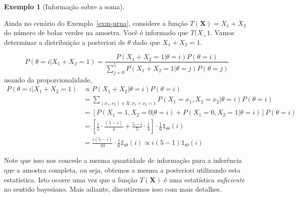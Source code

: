 \documentclass[
  portuguese,
  letterpaper,
  DIV=11,
  numbers=noendperiod]{scrreport}
\theoremstyle{definition}
\theoremstyle{definition}
\newtheorem{example}{Exemplo}[chapter]
\theoremstyle{plain}
\theoremstyle{remark}
\begin{document}
\begin{example}[Informação sobre a
soma]\protect\hypertarget{exm-infosomaurna}{}\label{exm-infosomaurna}

Ainda no cenário do Exemplo~\ref{exm-urna}, considere a função
\(T(\boldsymbol{X}) = X_1 +
X_2\) do número de bolas verdes na amostra. Você é informado que
\(T(X_ = 1\). Vamos determinar a distribuição a posteriori de \(\theta\)
dado que \(X_1 + X_2 = 1\).

\[
P(\theta = i \rvert X_1 + X_2 = 1) = \frac{P(X_1 + X_2 = 1 \rvert \theta =
i)P(\theta=i)}{\sum\limits^5_{j=0}P(X_1 + X_2 = 1 \rvert \theta = j)P(\theta=j)}
\] usando da proporcionalidade, \[
\begin{aligned}
P(\theta = i \rvert X_1 + X_2 = 1) &\propto P(X_1 + X_2 \rvert \theta =
i)P(\theta = i)\\ 
&= \sum\limits_{(x_1,x_2) \in \mathfrak{X} : x_1 + x_2 = 1}
P(X_1 = x_1, X_2 = x_2 \rvert \theta = i)P(\theta = i) \\
&= [P(X_1 = 1, X_2 = 0 \rvert \theta = i) + P(X_1 = 0, X_2 = 1 \rvert \theta = i)]P(\theta = i) \\
&= \left[\frac{i}{5} \cdot \frac{(5-i)}{4} + \frac{5-i}{5} \cdot \frac{i}{4}\right] \cdot \frac{1}{6} \mathbb{1}_\Theta(i) \\
&= \frac{i(5-i)}{10} \cdot \frac{1}{6} \mathbb{1}_\Theta(i) \propto i(5-1)
\mathbb{1}_\Theta(i)
\end{aligned}
\]

Note que isso nos concede a mesma quantidade de informação para a
inferência que a amostra completa, ou seja, obtemos a mesma a posteriori
utilizando esta estatística. Isto ocorre uma vez que a função
\(T(\boldsymbol{X})\) é uma estatística \emph{suficiente} no sentido
bayesiano. Mais adiante, discutiremos isso com mais detalhes.

\end{example}


\printbibliography
\end{document}
